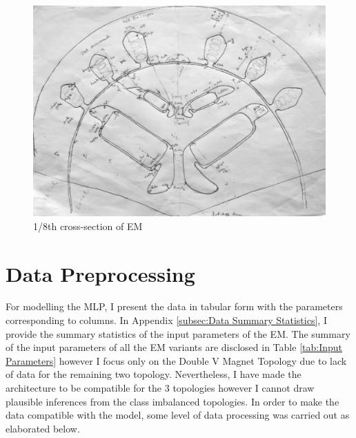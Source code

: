 \documentclass{report} %
\begin{document}
\begin{figure}[H]
    \centering
    \includegraphics[width=1\textwidth]{./ReportImages/EMCrosssectionFiltered.png} 
    \caption{1/8th cross-section of \ac{EM}}
    \label{fig:1/8 Motor Crossection}
\end{figure}

\section{Data Preprocessing}\label{sec:Data Preprocessing for MLP}
For modelling the \ac{MLP}, I present the data in tabular form with the parameters corresponding to columns. 
In Appendix \ref{subsec:Data Summary Statistics}, I provide the summary statistics of the input parameters of the \ac{EM}.
The summary of the input parameters of all the \ac{EM} variants are disclosed in Table \ref{tab:Input Parameters} however I focus only on the Double V Magnet Topology 
due to lack of data for the remaining two topology. Nevertheless, I have made the architecture to be compatible for the 3 topologies however I cannot draw plausible 
inferences from the class imbalanced topologies. In order to make the data compatible with the model, some level of data processing was carried out as elaborated below.
\end{document}
